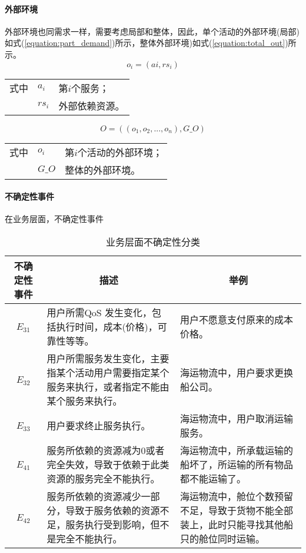 \paragraph{外部环境}
外部环境也同需求一样，需要考虑局部和整体，因此，单个活动的外部环境(局部)如式(\ref{equation:part_demand})所示，整体外部环境)如式(\ref{equation:total_out})所示。
\begin{equation}\label{equation:part_out}
o_i = \left(ai, rs_i \right)
\end{equation}
\begin{tabularx}{\textwidth}{@{}l@{\quad}l@{\pozhehao }X@{}}
    式中
    & ${a_i}$ & 第${i}$个服务； \\
    & ${rs_i}$ & 外部依赖资源。
\end{tabularx}\vspace{\wordsep}

\begin{equation}\label{equation:total_out}
O = \left((o_1, o_2, ..., o_n), G\_O \right)
\end{equation}
\begin{tabularx}{\textwidth}{@{}l@{\quad}l@{\pozhehao }X@{}}
    式中
    & ${o_i}$ & 第${i}$个活动的外部环境； \\
    & ${G\_O}$ & 整体的外部环境。
\end{tabularx}\vspace{\wordsep}

\paragraph{不确定性事件}
在业务层面，不确定性事件

\begin{table}[htbp]
    \caption{业务层面不确定性分类}
    \vspace{-0.5em}\label{table:bs_uc_type}\centering{}
    \begin{tabularx}{\textwidth}{cXX}
        \toprule
        不确定性事件  & \multicolumn{1}{c}{描述} & \multicolumn{1}{c}{举例} \\
        \midrule
        ~$E_{31}$~ & 用户所需QoS 发生变化，包括执行时间，成本(价格)，可靠性等等。& 用户不愿意支付原来的成本价格。  \\
        ~$E_{32}$~ & 用户所需服务发生变化，主要指某个活动用户需要指定某个服务来执行，或者指定不能由某个服务来执行。& 海运物流中，用户要求更换船公司。\\
        ~$E_{33}$~ & 用户要求终止服务执行。 & 海运物流中，用户取消运输服务。\\
        ~$E_{41}$~ & 服务所依赖的资源减为0或者完全失效，导致于依赖于此类资源的服务完全不能执行。 &海运物流中，所承载运输的船坏了，所运输的所有物品都不能运输了。\\
        ~$E_{42}$~ & 服务所依赖的资源减少一部分，导致于服务依赖的资源不足，服务执行受到影响，但不是完全不能执行。
        & 海运物流中，舱位个数预留不足，导致于货物不能全部装上，此时只能寻找其他船只的舱位同时运输。\\

        \bottomrule
    \end{tabularx}%
\end{table}%

